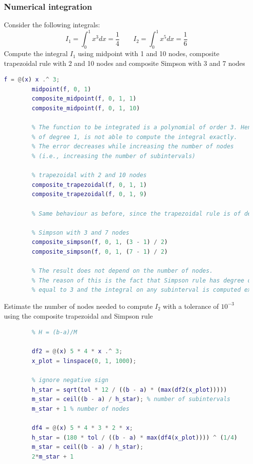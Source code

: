     \subsubsection{Numerical integration}
        Consider the following integrals:
        $$
        I_1 =\int_0^1x^3dx=\frac{1}{4}
        \qquad
        I_2 =\int_0^1x^5dx=\frac{1}{6}
        $$
        Compute the integral $I_1$ using midpoint with 1 and 10 nodes, composite trapezoidal rule with 2 and 10 nodes and composite Simpson with 3 and 7 nodes
        \begin{lstlisting}[language=Matlab, escapeinside=`', gobble=8]
        f = @(x) x .^ 3;
        midpoint(f, 0, 1)
        composite_midpoint(f, 0, 1, 1)
        composite_midpoint(f, 0, 1, 10)

        % The function to be integrated is a polynomial of order 3. Hence the rule,
        % of degree 1, is not able to compute the integral exactly.
        % The error decreases while increasing the number of nodes
        % (i.e., increasing the number of subintervals)

        % trapezoidal with 2 and 10 nodes
        composite_trapezoidal(f, 0, 1, 1)
        composite_trapezoidal(f, 0, 1, 9)

        % Same behaviour as before, since the trapezoidal rule is of degree 1.

        % Simpson with 3 and 7 nodes
        composite_simpson(f, 0, 1, (3 - 1) / 2)
        composite_simpson(f, 0, 1, (7 - 1) / 2)

        % The result does not depend on the number of nodes.
        % The reason of this is the fact that Simpson rule has degree of exactness
        % equal to 3 and the integral on any subinterval is computed exactly!
        \end{lstlisting}
        
        Estimate the number of nodes needed to compute $I_2$ with a tolerance of $10^{-3}$ using the composite trapezoidal and Simpson rule
        \begin{lstlisting}[language=Matlab, escapeinside=`', gobble=8]
        % compute #nodes with that tolerance using composite trapezoidal and simpson
        % H = (b-a)/M
        
        df2 = @(x) 5 * 4 * x .^ 3;
        x_plot = linspace(0, 1, 1000);
        
        % ignore negative sign
        h_star = sqrt(tol * 12 / ((b - a) * (max(df2(x_plot)))))
        m_star = ceil((b - a) / h_star); % number of subintervals
        m_star + 1 % number of nodes
        
        df4 = @(x) 5 * 4 * 3 * 2 * x;
        h_star = (180 * tol / ((b - a) * max(df4(x_plot)))) ^ (1/4)
        m_star = ceil((b - a) / h_star);
        2*m_star + 1
        \end{lstlisting}

